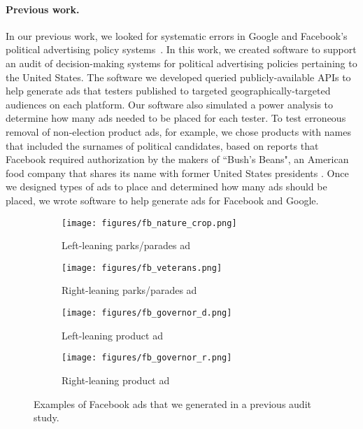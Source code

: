\paragraph{Previous work.} In our previous work, we looked for systematic
errors in Google and Facebook's political advertising policy
systems~\cite{hounsel2021software}.  In this work, we created software to
support an audit of decision-making systems for political advertising policies
pertaining to the United States. The software we developed queried publicly-available APIs
to help generate ads that testers published to targeted
geographically-targeted audiences on each platform. Our software also
simulated a power analysis to determine how many ads needed to be placed for
each tester. To test erroneous removal of non-election product ads, for
example, we chose
products with names that included the surnames of political candidates, based
on reports that Facebook required authorization by the makers of ``Bush's
Beans", an American food company that shares its name with former United
States presidents \cite{rosenberg_facebook_2018}.
Once we designed types of ads to place and determined how many ads should be
placed, we wrote software to help generate ads for Facebook and Google.



\begin{figure*}[h!]
  \centering
  \begin{subfigure}[b]{0.2\textwidth}
    \texttt{[image: figures/fb\_nature\_crop.png]}
    \caption{Left-leaning parks/parades ad}
    \label{fig:facebook_ad_1}
  \end{subfigure}
  \begin{subfigure}[b]{0.2\textwidth}
    \texttt{[image: figures/fb\_veterans.png]}
    \caption{Right-leaning parks/parades ad}
    \label{fig:facebook_ad_2}
  \end{subfigure}
  \begin{subfigure}[b]{0.2\textwidth}
    \texttt{[image: figures/fb\_governor\_d.png]}
    \caption{Left-leaning product ad}
    \label{fig:facebook_ad_3}
  \end{subfigure}
  \begin{subfigure}[b]{0.2\textwidth}
    \texttt{[image: figures/fb\_governor\_r.png]}
    \caption{Right-leaning product ad}
    \label{fig:facebook_ad_4}
  \end{subfigure}
    \caption{Examples of Facebook ads that we generated in a previous audit study.}
  \label{fig:facebook_ad_examples}
\end{figure*}

